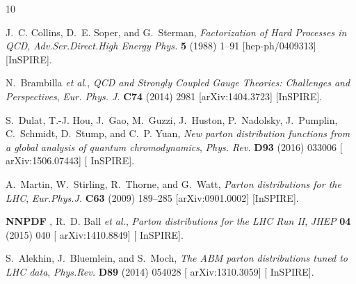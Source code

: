 \providecommand{\href}[2]{#2}\begingroup\raggedright\begin{thebibliography}{10}

J.~C. Collins, D.~E. Soper, and G.~Sterman, {\it {Factorization of Hard
  Processes in QCD}},
{\em Adv.Ser.Direct.High Energy Phys.} {\bfseries 5} (1988) 1--91
  [\href{http://arxiv.org/abs/hep-ph/0409313}{{\ttfamily hep-ph/0409313}}]
  [\href{http://inspirehep.net/record/25808}{{\ttfamily InSPIRE}}].

N.~Brambilla {\em et al.}, {\it {QCD and Strongly Coupled Gauge Theories:
  Challenges and Perspectives}},
\href{http://dx.doi.org/10.1140/epjc/s10052-014-2981-5}{{\em Eur. Phys. J.}
  {\bfseries C74} (2014) 2981}
  [\href{http://arxiv.org/abs/1404.3723}{{\ttfamily arXiv:1404.3723}}]
  [\href{http://inspirehep.net/record/1290484}{{\ttfamily InSPIRE}}].

S.~Dulat, T.-J. Hou, J.~Gao, M.~Guzzi, J.~Huston, P.~Nadolsky, J.~Pumplin,
  C.~Schmidt, D.~Stump, and C.~P. Yuan, {\it {New parton distribution functions
  from a global analysis of quantum chromodynamics}},
\href{http://dx.doi.org/10.1103/PhysRevD.93.033006}{{\em Phys. Rev.} {\bfseries
  D93} (2016) 033006} [\href{http://arxiv.org/abs/1506.07443}{{\ttfamily
  arXiv:1506.07443}}] [\href{http://inspirehep.net/record/1377752}{{\ttfamily
  InSPIRE}}].

A.~Martin, W.~Stirling, R.~Thorne, and G.~Watt, {\it {Parton distributions for
  the LHC}},
\href{http://dx.doi.org/10.1140/epjc/s10052-009-1072-5}{{\em Eur.Phys.J.}
  {\bfseries C63} (2009) 189--285}
  [\href{http://arxiv.org/abs/0901.0002}{{\ttfamily arXiv:0901.0002}}]
  [\href{http://inspirehep.net/record/810127}{{\ttfamily InSPIRE}}].

{\bfseries NNPDF} , R.~D. Ball {\em et al.}, {\it {Parton distributions for the
  LHC Run II}},
\href{http://dx.doi.org/10.1007/JHEP04(2015)040}{{\em JHEP} {\bfseries 04}
  (2015) 040} [\href{http://arxiv.org/abs/1410.8849}{{\ttfamily
  arXiv:1410.8849}}] [\href{http://inspirehep.net/record/1325552s}{{\ttfamily
  InSPIRE}}].

S.~Alekhin, J.~Bluemlein, and S.~Moch, {\it {The ABM parton distributions tuned
  to LHC data}},
\href{http://dx.doi.org/10.1103/PhysRevD.89.054028}{{\em Phys.Rev.} {\bfseries
  D89} (2014) 054028} [\href{http://arxiv.org/abs/1310.3059}{{\ttfamily
  arXiv:1310.3059}}] [\href{http://inspirehep.net/record/1258127}{{\ttfamily
  InSPIRE}}].


\end{thebibliography}
